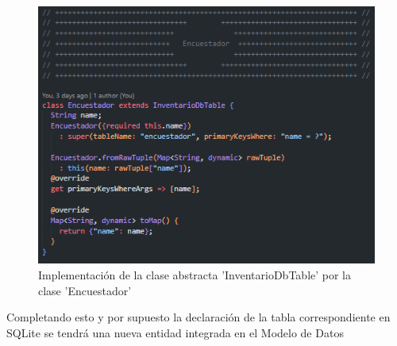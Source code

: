 \begin{figure}[h]
    \centering
    \includegraphics[]{Graphics/Capitulo 3/implementacion_InventarioDBTable.png}
    \caption{Implementación de la clase abstracta 'InventarioDbTable' por la clase 'Encuestador'}
    \label{fig:figura19}
\end{figure}


Completando esto y por supuesto la declaración de la tabla correspondiente en SQLite se tendrá una nueva entidad integrada en el Modelo de Datos
\\
